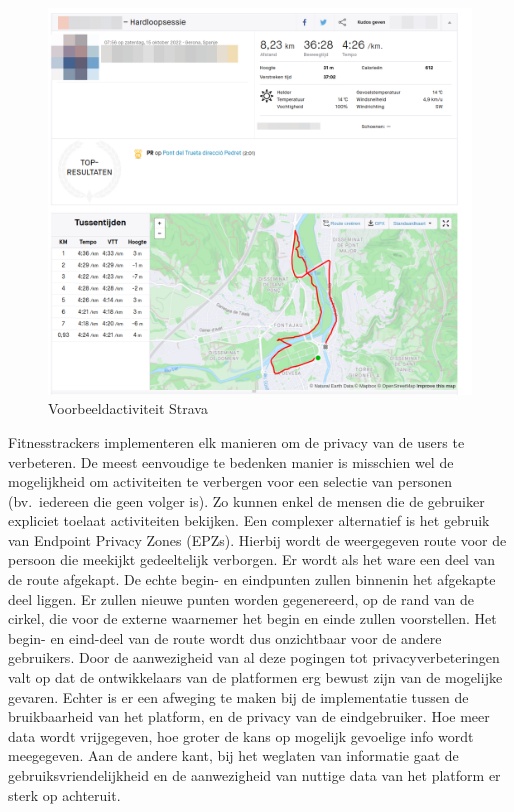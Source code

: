 \begin{figure}
    \centering
    \includegraphics[width=0.5\linewidth]{fig/VoorbeeldActiviteiten/VoorbeeldActiviteit_Cropped.png}
    \caption{Voorbeeldactiviteit Strava}\label{fig:activityExample}
\end{figure}

Fitnesstrackers implementeren elk manieren om de privacy van de users te
verbeteren. De meest eenvoudige te bedenken manier is misschien wel de
mogelijkheid om activiteiten te verbergen voor een selectie van personen (bv.\
iedereen die geen volger is). Zo kunnen enkel de mensen die de gebruiker
expliciet toelaat activiteiten bekijken. Een complexer alternatief is het
gebruik van Endpoint Privacy Zones (\acp{EPZ}). Hierbij wordt de weergegeven
route voor de persoon die meekijkt gedeeltelijk verborgen. Er wordt als het
ware een deel van de route afgekapt. De echte begin- en eindpunten zullen
binnenin het afgekapte deel liggen. Er zullen nieuwe punten worden gegenereerd,
op de rand van de cirkel, die voor de externe waarnemer het begin en einde
zullen voorstellen. Het begin- en eind-deel van de route wordt dus onzichtbaar
voor de andere gebruikers. Door de aanwezigheid van al deze pogingen tot
privacyverbeteringen valt op dat de ontwikkelaars van de platformen erg bewust
zijn van de mogelijke gevaren. Echter is er een afweging te maken bij de
implementatie tussen de bruikbaarheid van het platform, en de privacy van de
eindgebruiker. Hoe meer data wordt vrijgegeven, hoe groter de kans op mogelijk
gevoelige info wordt meegegeven. Aan de andere kant, bij het weglaten van
informatie gaat de gebruiksvriendelijkheid en de aanwezigheid van nuttige data
van het platform er sterk op achteruit.

